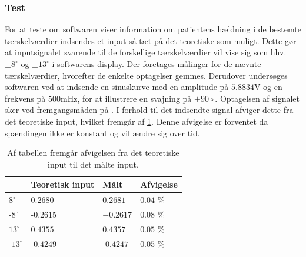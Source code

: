 \subsubsection{Test}
For at teste om softwaren viser information om patientens hældning i de bestemte tærskelværdier indsendes et input så tæt på det teoretiske som muligt. Dette gør at inputsignalet svarende til de forskellige tærskelværdier vil vise sig som hhv. $\pm 8^{\circ}$ og $\pm 13^{\circ}$ i softwarens display. Der foretages målinger for de nævnte tærskelværdier, hvorefter de enkelte optagelser gemmes.
Derudover undersøges softwaren ved at indsende en sinuskurve med en amplitude på $5.8834$V og en frekvens på $500$mHz, for at illustrere en svajning på $\pm 90{\circ}$. Optagelsen af signalet sker ved fremgangsmåden på . I forhold til det indsendte signal afviger dette fra det teoretiske input, hvilket fremgår af \ref{Tab:afvigelse_software}. Denne afvigelse er forventet da spændingen ikke er konstant og vil ændre sig over tid. 

\begin{table}[H]
\centering
\begin{tabular}{l|l|l|l|} \hline
             & Teoretisk input & Målt 	& Afvigelse \\ \hline
$8^{\circ}$   & $0.2680$          & $0.2681$  & $0.04$ \% \\ \hline
-$8^{\circ}$   & -$0.2615$         & $-0.2617$ & $0.08$ \%  \\ \hline
$13^{\circ}$  & $0.4355$          & $0.4357$  & $0.05$ \% \\ \hline
-$13^{\circ}$ & -$0.4249$         & -$0.4247$ & $0.05$ \% \\ \hline    
\end{tabular}
\caption{Af tabellen fremgår afvigelsen fra det teoretiske input til det målte input.}
\label{Tab:afvigelse_software}
\end{table}

